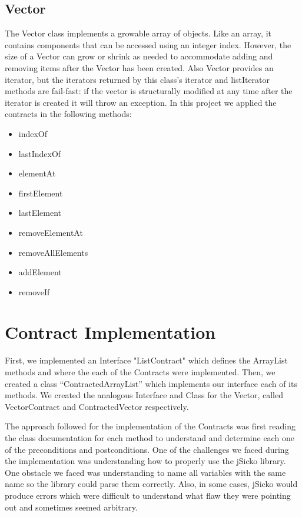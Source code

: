 \documentclass[a4paper]{article}
\begin{document}
\subsection{Vector}
The Vector class implements a growable array of objects. Like an array, it contains components that can be accessed using an integer index. However, the size of a Vector can grow or shrink as needed to accommodate adding and removing items after the Vector has been created.
Also Vector provides an iterator, but the iterators returned by this class's iterator and listIterator methods are fail-fast: if the vector is structurally modified at any time after the iterator is created it will throw an exception. 
In this project we applied the contracts in the following methods:
\begin{itemize}
	\item indexOf
	\item lastIndexOf
	\item elementAt
	\item firstElement
	\item lastElement
	\item removeElementAt
	\item removeAllElements
	\item addElement
	\item removeIf
\end{itemize}

\section{Contract Implementation}

First, we implemented an Interface "ListContract" which defines the ArrayList methods and where the each of the Contracts were implemented. Then, we created a class ``ContractedArrayList'' which implements our interface each of its methods. We created the analogous Interface and Class for the Vector, called VectorContract and ContractedVector respectively. \par
The approach followed for the implementation of the Contracts was first reading the class documentation for each method to understand and determine each one of the preconditions and postconditions. 
One of the challenges we faced during the implementation was understanding how to properly use the jSicko library. One obstacle we faced was understanding to name all variables with the same name so the library could parse them correctly. Also, in some cases, jSicko would produce errors which were difficult to understand what flaw they were pointing out and sometimes seemed arbitrary. 
\end{document}
